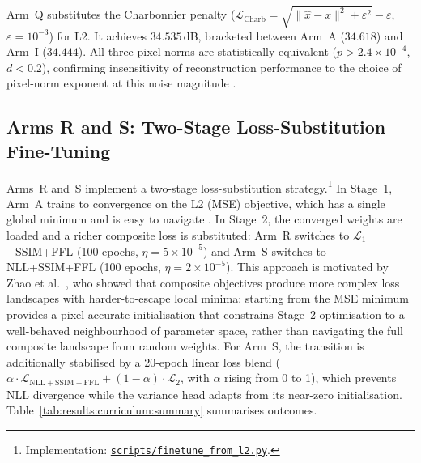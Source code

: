 \documentclass[12pt, a4paper, twoside, openright]{book}
\begin{document}
Arm~Q substitutes the Charbonnier penalty \cite{charbonnier_two_1994} ($\mathcal{L}_{\mathrm{Charb}} = \sqrt{\|\hat{x}-x\|^2+\varepsilon^2}-\varepsilon$, $\varepsilon=10^{-3}$) for L2. It achieves $34.535$\,dB, bracketed between Arm~A ($34.618$) and Arm~I ($34.444$). All three pixel norms are statistically equivalent ($p>2.4\times10^{-4}$, $d<0.2$), confirming insensitivity of reconstruction performance to the choice of pixel-norm exponent at this noise magnitude \cite{zhao_loss_2017}.

\subsection{Arms R and S: Two-Stage Loss-Substitution Fine-Tuning}
\label{sec:results:curriculum:ft}

Arms~R and~S implement a two-stage loss-substitution strategy.\footnote{Implementation: \href{https://github.com/teklesam/ppva_hformer_codebase/blob/main/scripts/finetune_from_l2.py}{\texttt{scripts/finetune\_from\_l2.py}}.} In Stage~1, Arm~A trains to convergence on the L2 (MSE) objective, which has a single global minimum and is easy to navigate \cite{zhao_loss_2017}. In Stage~2, the converged weights are loaded and a richer composite loss is substituted: Arm~R switches to $\mathcal{L}_1$+SSIM+FFL (100 epochs, $\eta=5\times10^{-5}$) and Arm~S switches to NLL+SSIM+FFL (100 epochs, $\eta=2\times10^{-5}$). This approach is motivated by Zhao et al.\ \cite{zhao_loss_2017}, who showed that composite objectives produce more complex loss landscapes with harder-to-escape local minima: starting from the MSE minimum provides a pixel-accurate initialisation that constrains Stage~2 optimisation to a well-behaved neighbourhood of parameter space, rather than navigating the full composite landscape from random weights. For Arm~S, the transition is additionally stabilised by a 20-epoch linear loss blend ($\alpha \cdot \mathcal{L}_{\mathrm{NLL+SSIM+FFL}} + (1-\alpha) \cdot \mathcal{L}_2$, with $\alpha$ rising from 0 to 1), which prevents NLL divergence while the variance head adapts from its near-zero initialisation. Table~\ref{tab:results:curriculum:summary} summarises outcomes.
\end{document}
